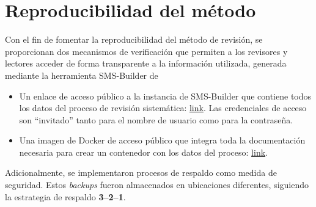 \section{Reproducibilidad del método}
\noindent
Con el fin de fomentar la reproducibilidad del método de revisión, se proporcionan dos mecanismos de verificación que permiten a los revisores y lectores acceder de forma transparente a la información utilizada, generada mediante la herramienta SMS-Builder de~\cite{SMSBuilder2020}
\begin{itemize}
	\item Un enlace de acceso público a la instancia de SMS-Builder que contiene todos los datos del proceso de revisión sistemática: \href{https://sms-htcondor.iti.grid.uniquindio.edu.co}{link}. Las credenciales de acceso son ``invitado'' tanto para el nombre de usuario como para la contraseña.
	\item Una imagen de Docker de acceso público que integra toda la documentación necesaria para crear un contenedor con los datos del proceso: \href{https://hub.docker.com/r/parritap/sms-htcondor-universes}{link}.
\end{itemize}

\noindent
Adicionalmente, se implementaron procesos de respaldo como medida de seguridad. Estos \textit{backups} fueron almacenados en ubicaciones diferentes, siguiendo la estrategia de respaldo \textbf{3--2--1}.



